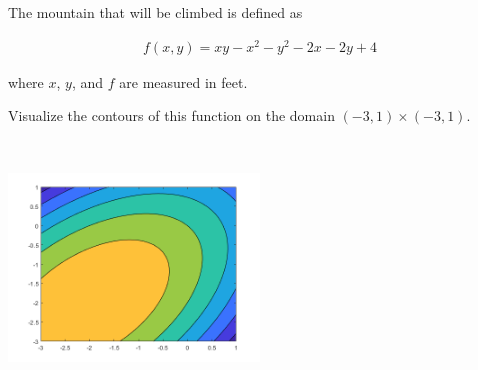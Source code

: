The mountain that will be climbed is defined as

\begin{align*}
    f(x, y) = xy - x^2 - y^2 - 2x - 2y + 4
\end{align*}

where $x$, $y$, and $f$ are measured in feet.

Visualize the contours of this function on the domain $(-3, 1) \times (-3, 1)$.

\begin{solution} \
\begin{center}
    \includegraphics[width=0.5\textwidth]{img/e7p1.png}
\end{center}
\end{solution}